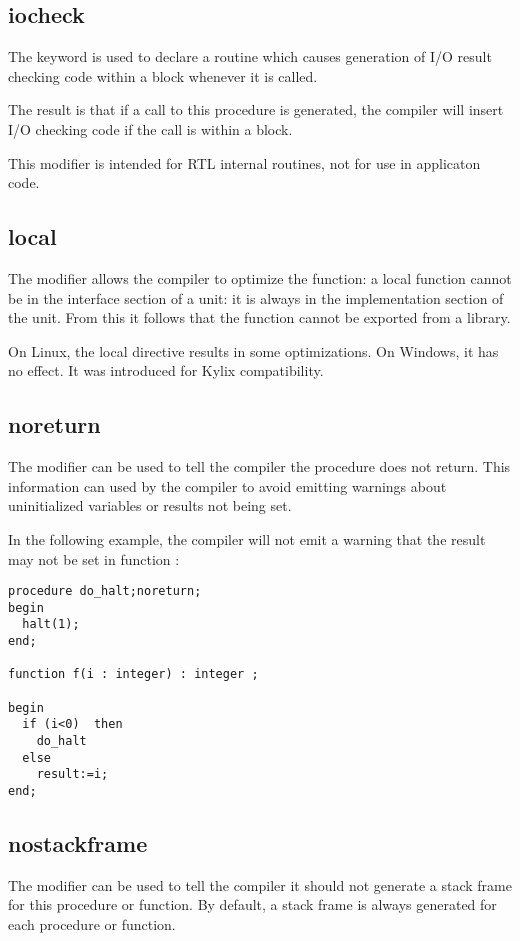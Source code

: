 \subsection{iocheck}
\label{se:iocheck}
The  keyword is used to declare a routine which causes
generation of I/O result checking code within a 
block whenever it is called.

The result is that if a call to this procedure is generated, the compiler will 
insert I/O checking code if the call is within a  block.

This modifier is intended for RTL internal routines, not for use in
applicaton code.

\subsection{local}
\label{se:local}
The  modifier allows the compiler to optimize the function: a local
function cannot be in the interface section of a unit: it is always in the
implementation section of the unit. From this it follows that the function
cannot be exported from a library. 

On Linux, the local directive results in some optimizations. On Windows, it
has no effect. It was introduced for Kylix compatibility.

\subsection{noreturn}
\label{se:noreturn}
The  modifier can be used to tell the compiler the procedure
does not return. This information can used by the compiler to avoid emitting
warnings about uninitialized variables or results not being set. 

In the following example, the compiler will not emit a warning that the
result may not be set in function :
\begin{verbatim}
procedure do_halt;noreturn;
begin
  halt(1);
end;

function f(i : integer) : integer ;

begin
  if (i<0)  then
    do_halt
  else
    result:=i;
end;
\end{verbatim}

\subsection{nostackframe}
\label{se:nostackframe}
The  modifier can be used to tell the compiler it should
not generate a stack frame for this procedure or function. By default, a
stack frame is always generated for each procedure or function.

